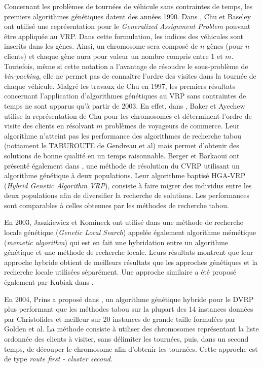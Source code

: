 Concernant les problèmes de tournées de véhicule sans contraintes de temps, les premiers algorithmes génétiques datent des années 1990. Dans \cite{Chu1997}, Chu et Baseley ont utilisé une représentation pour le \textit{Generalized Assignment Problem} pouvant être appliquée au VRP. Dans cette formulation, les indices des véhicules sont inscrits dans les gènes. Ainsi, un chromosome sera composé de $n$ gènes (pour $n$ clients) et chaque gène aura pour valeur un nombre compris entre $1$ et $m$. Toutefois, même si cette notation a l'avantage de résoudre le sous-problème de \textit{bin-packing}, elle ne permet pas de connaître l'ordre des visites dans la tournée de chaque véhicule.
Malgré les travaux de Chu en 1997, les premiers résultats concernant l'application d'algorithmes génétiques au VRP sans contraintes de temps ne sont apparus qu'à partir de 2003. En effet, dans \cite{Baker2003}, Baker et Ayechew utilise la représentation de Chu pour les chromosomes et déterminent l'ordre de visite des clients en résolvant $m$ problèmes de voyageurs de commerce. Leur algorithme n'atteint pas les performance des algorithmes de recherche tabou (nottament le TABUROUTE de Gendreau et al) mais permet d'obtenir des solutions de bonne qualité en un temps raisonnable.
Berger et Barkaoui ont présenté également dans \cite{Berger2003}, une méthode de résolution du CVRP utilisant un algorithme génétique à deux populations. Leur algorithme baptisé HGA-VRP (\textit{Hybrid Genetic Algorithm VRP}), consiste à faire migrer des individus entre les deux populations afin de diversifier la recherche de solutions. Les performances sont comparables à celles obtenues par les méthodes de recherche tabou.

En 2003, Jaszkiewicz et Komineck ont utilisé dans \cite{Jaszkiewicz2003} une méthode de recherche locale génétique (\textit{Genetic Local Search}) appelée également algorithme mémétique (\textit{memetic algorithm}) qui est en fait une hybridation entre un algorithme génétique et une méthode de recherche locale. Leurs résultats montrent que leur approche hybride obtient de meilleurs résultats que les approches génétiques et la recherche locale utilisées séparément. Une approche similaire a été proposé également par Kubiak dans \cite{Kubiak2004}.

En 2004, Prins a proposé dans \cite{Prins2004}, un algorithme génétique hybride pour le DVRP plus performant que les méthodes tabou sur la plupart des 14 instances données par Christofides et meilleur sur 20 instances de grande taille formulées par Golden et al. La méthode consiste à utiliser des chromosomes représentant la liste ordonnée des clients à visiter, sans délimiter les tournées, puis, dans un second temps, de découper le chromosome afin d'obtenir les tournées. Cette approche est de type \textit{route first - cluster second}.

